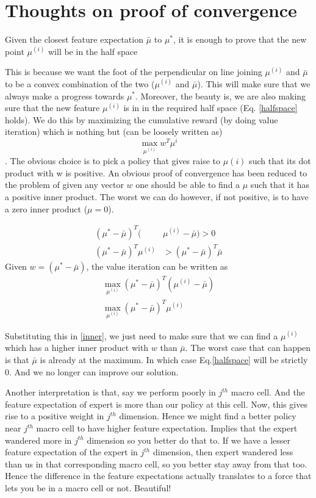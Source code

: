 \documentclass{article}[11pt]
\begin{document}
\section{Thoughts on proof of convergence}
Given the closest feature expectation $\bar{\mu}$ to $\mu^*$, it is enough to prove that the new point $\mu^{(i)}$ will be in the half space 

This is because we want the foot of the perpendicular on line joining $\mu^{(i)}$ and $\bar{\mu}$ to be a convex combination of the two ($\mu^{(i)}$ and $\bar{\mu}$). This will make sure that we always make a progress towards $\mu^*$. Moreover, the beauty is, we are also making sure that the new feature $\mu^{(i)}$ is in in the required half space (Eq. \ref{halfspace} holds). We do this by maximizing the cumulative reward (by doing value iteration) which is nothing but (can be loosely written as) $$\max_{\mu^{(i)}}w^T\mu^{i}$$. The obvious choice is to pick a policy that gives raise to $\mu{(i)}$ such that its dot product with w is positive. An obvious proof of convergence has been reduced to the problem of given any vector $w$ one should be able to find a $\mu$ such that it has a positive inner product. The worst we can do however, if not positive, is to have a zero inner product ($\mu = 0$). 

\begin{align}
\label{halfspace}
(\mu^* - \bar{\mu})^T(&\mu^{(i)} -\bar{\mu}) > 0 \\
\label{inner}
(\mu^* - \bar{\mu})^T \mu^{(i)} &> (\mu^* - \bar{\mu})^T \bar{\mu}
\end{align} 
 Given $w = (\mu^* - \bar{\mu})$, the value iteration can be written as
 \begin{align*}
 \max_{\mu^{(i)}}(\mu^* - \bar{\mu})^T(\mu^{(i)} -\bar{\mu})\\
 \max_{\mu^{(i)}}(\mu^* - \bar{\mu})^T\mu^{(i)}
 \end{align*}
 
 Substituting this in \ref{inner}, we just need to make sure that we can find a $\mu^{(i)}$ which has a higher inner product with $w$ than $\bar{\mu}$. The worst case that can happen is that $\bar{\mu}$ is already at the maximum. In which case Eq.\ref{halfspace} will be strictly 0. And we no longer can improve our solution.  
 
Another interpretation is that, say we perform poorly in $j^{th}$ macro cell. And the feature expectation of expert is more than our policy at this cell. Now, this gives rise to a positive weight in $j^{th}$ dimension. Hence we might find a better policy near $j^{th}$ macro cell to have higher feature expectation. Implies that the expert wandered more in $j^{th}$ dimension so you better do that to. If we have a lesser feature expectation of the expert in $j^{th}$ dimension, then expert wandered less than us in that corresponding macro cell, so you better stay away from that too. Hence the difference in the feature expectations actually translates to a force that lets you be in a macro cell or not. Beautiful! 
\end{document}
